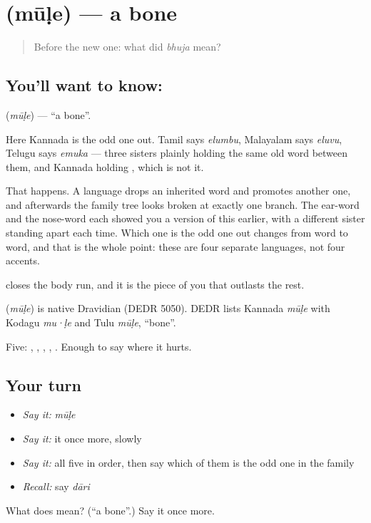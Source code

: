 \section[\texorpdfstring{\kn{ಮೂಳೆ} (mūḷe)}{ಮೂಳೆ (mūḷe)}]{ (mūḷe) — a bone}

\label{lesson:KA-C57-bone}



\begin{quote}
Before the new one: what did \emph{bhuja} mean?
\end{quote}

\subsection*{You'll want to know: }
\textbf{} (\emph{mūḷe}) — \textquotedblleft{}a bone\textquotedblright{}.

Here Kannada is the odd one out. Tamil says \emph{elumbu}, Malayalam says \emph{eluvu}, Telugu says \emph{emuka} — three sisters plainly holding the same old word between them, and Kannada holding , which is not it.

That happens. A language drops an inherited word and promotes another one, and afterwards the family tree looks broken at exactly one branch. The ear-word and the nose-word each showed you a version of this earlier, with a different sister standing apart each time. Which one is the odd one out changes from word to word, and that is the whole point: these are four separate languages, not four accents.

 closes the body run, and it is the piece of you that outlasts the rest.

\begin{cousinweb}
\textbf{} (\emph{mūḷe}) is native Dravidian (DEDR 5050). DEDR lists Kannada \emph{mūḷe} with Kodagu \emph{mu·ḷe} and Tulu \emph{mūḷe}, \textquotedblleft{}bone\textquotedblright{}.
\end{cousinweb}

\begin{grammarlens}[title={What you've built}]
Five: , , , , . Enough to say where it hurts.
\end{grammarlens}

\subsection*{Your turn}
\begin{itemize}
\raggedright
  \item \emph{Say it:} \emph{mūḷe}
  \item \emph{Say it:} it once more, slowly
  \item \emph{Say it:} all five in order, then say which of them is the odd one in the family
  \item \emph{Recall:} say \emph{dāri}
\end{itemize}

\begin{tcolorbox}[breakable,colback=teal!4,colframe=teal!35!black,title={Before you move on}]
What does  mean? (\textquotedblleft{}a bone\textquotedblright{}.) Say it once more.
\end{tcolorbox}
